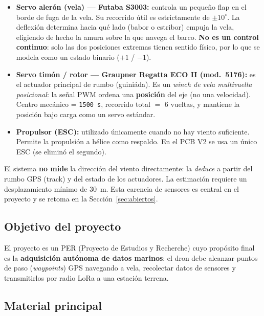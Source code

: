 \documentclass[12pt,a4paper]{article}
\newcommand{\us}[1]{\texttt{#1\,\textmu s}}
\begin{document}
\begin{itemize}
  \item \textbf{Servo aler\'on (vela) --- Futaba S3003:} controla un peque\~no
    flap en el borde de fuga de la vela. Su recorrido \'util es estrictamente de
    $\pm10^{\circ}$. La deflexi\'on determina hacia qu\'e lado (babor o estribor)
    empuja la vela, eligiendo de hecho la amura sobre la que navega el barco.
    \textbf{No es un control continuo}: solo las dos posiciones extremas tienen
    sentido f\'isico, por lo que se modela como un estado binario ($+1$ / $-1$).

  \item \textbf{Servo tim\'on / rotor --- Graupner Regatta ECO II (mod.\ 5176):}
    es el actuador principal de rumbo (guini\'ada). Es un \emph{winch de vela
    multivuelta posicional}: la se\~nal PWM ordena una \textbf{posici\'on} del eje
    (no una velocidad). Centro mec\'anico = \us{1500}, recorrido total $=$ 6 vueltas,
    y mantiene la posici\'on bajo carga como un servo est\'andar.

  \item \textbf{Propulsor (ESC):} utilizado \'unicamente cuando no hay viento
    suficiente. Permite la propulsi\'on a h\'elice como respaldo. En el PCB V2 se
    usa un \'unico ESC (se elimin\'o el segundo).
\end{itemize}

\begin{infobox}
  El sistema \textbf{no mide} la direcci\'on del viento directamente: la
  \emph{deduce} a partir del rumbo GPS (track) y del estado de los actuadores.
  La estimaci\'on requiere un desplazamiento m\'inimo de 30~m. Esta carencia de
  sensores es central en el proyecto y se retoma en la Secci\'on~\ref{sec:abiertos}.
\end{infobox}

\subsection{Objetivo del proyecto}

El proyecto es un PER (Proyecto de Estudios y Recherche) cuyo prop\'osito final es
la \textbf{adquisici\'on aut\'onoma de datos marinos}: el dron debe alcanzar puntos
de paso (\emph{waypoints}) GPS navegando a vela, recolectar datos de sensores y
transmitirlos por radio LoRa a una estaci\'on terrena.

\subsection{Material principal}
\end{document}
